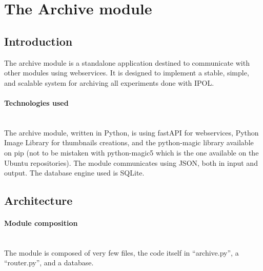 \section{The Archive module}
\label{sec:archive}


\subsection{Introduction}
\label{sec:archive_introduction}

The archive module is a standalone application destined to communicate with other modules using webservices. It is designed to implement a stable, simple, and scalable system for archiving all experiments done with IPOL.

\paragraph{Technologies used} \hspace{0pt} \\
The archive module, written in Python, is using fastAPI for webservices, Python Image Library for thumbnails creations, and the python-magic library available on pip (not to be mistaken with python-magic5 which is the one available on the Ubuntu repositories). The module communicates using JSON, both in input and output. The database engine used is SQLite.

\subsection{Architecture}

\paragraph{Module composition} \hspace{0pt} \\
The module is composed of very few files, the code itself in ``archive.py'', a ``router.py'', and a database.

